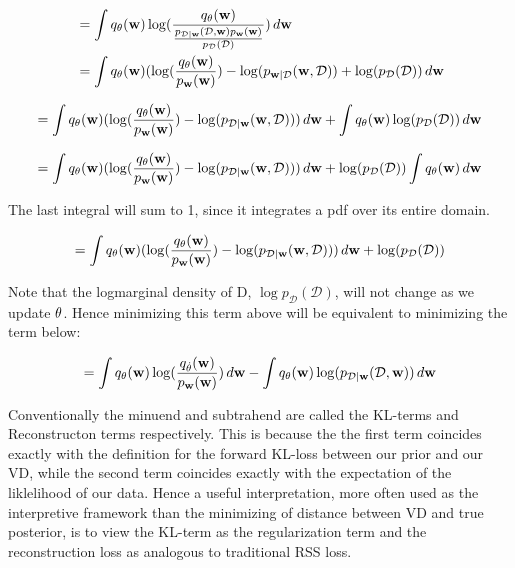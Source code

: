 \documentclass[nofootinbib,UKenglish,nobalancelastpage,12pt]{article}
\newcommand{\vect}{\ensuremath{\mathbf}}
\begin{document}
$$
\begin{aligned}
& =\int q_{\vect{\theta}}(\vect{w}) \log (\frac{q_{\vect{\theta}}(\vect{w})}{\frac{p_{\mathcal{D}|\vect{w}}(\mathcal{D},\vect{w}) p_{\vect{w}}(\vect{w})}{p_{\mathcal{D}}(\mathcal{D})}}) \,d \vect{w} \\ 
& =\int q_{\vect{\theta}}(\vect{w})(\log (\frac{q_{\vect{\theta}}(\vect{w})}{p_{\vect{w}}(\vect{w})})-\log (p_{\vect{w}|\mathcal{D}}(\vect{w}, \mathcal{D}))+\log (p_{\mathcal{D}}(\mathcal{D})) \,d \vect{w}
\end{aligned}
$$



$$
=\int q_{\vect{\theta}}(\vect{w})(\log (\frac{q_{\vect{\theta}}(\vect{w})}{p_{\vect{w}}(\vect{w})})-\log (p_{\mathcal{D}|\vect{w}}(\vect{w}, \mathcal{D}))) \,d \vect{w} +\int q_{\vect{\theta}}(\vect{w}) \log (p_{\mathcal{D}}(\mathcal{D}))\,d\vect{w}
$$

$$
=\int q_{\vect{\theta}}(\vect{w})(\log (\frac{q_{\vect{\theta}}(\vect{w})}{p_{\vect{w}}(\vect{w})})-\log (p_{\mathcal{D}|\vect{w}}(\vect{w}, \mathcal{D}))) \,d \vect{w} + \log (p_{\mathcal{D}}(\mathcal{D})) \int q_{\vect{\theta}}(\vect{w}) \,d\vect{w}
$$

The last integral will sum to 1, since it integrates a pdf over its entire domain.

$$
=\int q_{\vect{\theta}}(\vect{w})(\log (\frac{q_{\vect{\theta}}(\vect{w})}{p_{\vect{w}}(\vect{w})})-\log (p_{\mathcal{D}|\vect{w}}(\vect{w}, \mathcal{D}))) \,d \vect{w} + \log (p_{\mathcal{D}}(\mathcal{D}))
$$

Note that the logmarginal density of D, $\log{p_{\mathcal{D}}(\mathcal{D})}$, will not change as we update $\vect{\theta}$. Hence minimizing this term above will be equivalent to minimizing the term below:

$$
=\int q_{\vect{\theta}}(\vect{w}) \log (\frac{q_{\dot{\theta}}(\vect{w})}{p_{\vect{w}}(\vect{w})}) \,d \vect{w}-\int q_{\vect{\theta}}(\vect{w}) \log (p_{\mathcal{D}|\vect{w}}(\mathcal{D},\vect{w})) \,d \vect{w}
$$



Conventionally the minuend and subtrahend are called the KL-terms and Reconstructon terms respectively. This is because the the first term coincides exactly with the definition for the forward KL-loss between our prior and our VD, while the second term coincides exactly with the expectation of the liklelihood of our data. Hence a useful interpretation, more often used as the interpretive framework than the minimizing of distance between VD and true posterior, is to view the KL-term as the regularization term and the reconstruction loss as analogous to traditional RSS loss.
\end{document}
